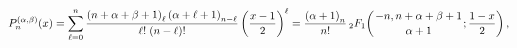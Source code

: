 \[\mathop{P^{(\alpha,\beta)}_{n}\/}\nolimits\!\left(x\right)=\sum_{\ell=0}^{n}%
\frac{\left(n+\alpha+\beta+1\right)_{\ell}\left(\alpha+\ell+1\right)_{n-\ell}}%
{\ell!\;(n-\ell)!}\left(\frac{x-1}{2}\right)^{\ell}=\frac{\left(\alpha+1\right%
)_{n}}{n!}\mathop{{{}_{2}F_{1}}\/}\nolimits\!\left({-n,n+\alpha+\beta+1\atop%
\alpha+1};\frac{1-x}{2}\right),\]
